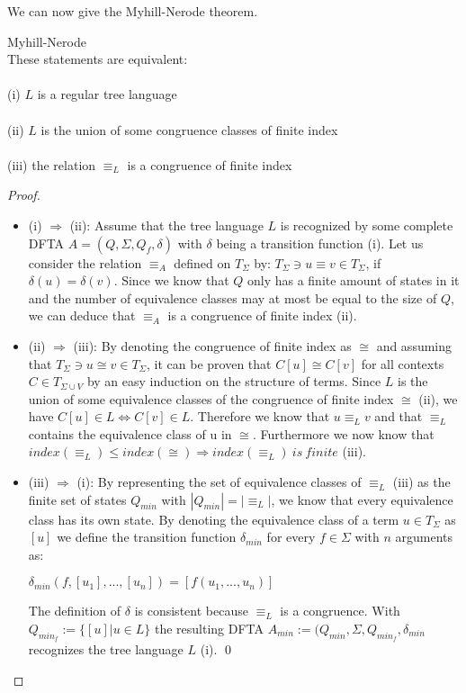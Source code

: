 \documentclass{llncs}
\begin{document}
\pagebreak

We can now give the Myhill-Nerode theorem.

\begin{theorem}{Myhill-Nerode} \cite{tata-nfta}\\
	These statements are equivalent:\\\\
	(i) \(L\) is a regular tree language\\\\
	(ii) \(L\) is the union of some congruence classes of finite index\\\\
	(iii) the relation \(\equiv_L\) is a congruence of finite index
\end{theorem}
\begin{proof}{~}
	\begin{itemize}
		\item (i) \(\Rightarrow\) (ii): Assume that the tree language \(L\) is recognized by some complete DFTA \(A = (Q, \Sigma, Q_f, \delta)\) with \(\delta\) being a transition function (i).
		Let us consider the relation \(\equiv_A\) defined on \(T_\Sigma\) by: \(T_\Sigma \ni u \equiv v \in T_\Sigma\), if \(\delta(u) = \delta(v)\). Since we know that \(Q\) only has a finite amount of states in it and the number of equivalence classes may at most be equal to the size of \(Q\), we can deduce that \(\equiv_A\) is a congruence of finite index (ii).
		\\
		\item (ii) \(\Rightarrow\) (iii): By denoting the congruence of finite index as \(\cong\) and assuming that \(T_\Sigma \ni u \cong v \in T_\Sigma\), it can be proven that \(C[u] \cong C[v]\) for all contexts \(C \in T_{\Sigma \cup V} \) by an easy induction on the structure of terms. Since \(L\) is the union of some equivalence classes of the congruence of finite index \(\cong\) (ii), we have \(C[u] \in L \iff C[v] \in L \). Therefore we know that  \( u \equiv_L v \) and that \( \equiv_L \) contains the equivalence class of u in \( \cong \). Furthermore we now know that \(index(\equiv_L) \leq index(\cong) \Rightarrow index(\equiv_L)~is~finite \) (iii).
		\\
		\item (iii) \(\Rightarrow\) (i):
		 By representing the set of equivalence classes of \( \equiv_L \) (iii) as the finite set of states \(Q_{min}\) with \(|Q_{min}| = |\equiv_L|\), we know that every equivalence class has its own state. By denoting the equivalence class of a term \(u \in T_\Sigma\) as \([u]\) we define the transition function \(\delta_{min}\) for every \( f \in \Sigma\) with \(n\) arguments as:
		 \begin{center}
			 \(\delta_{min}(f, [u_1], ..., [u_n]) = [f(u_1, ..., u_n)]\)
		 \end{center}
		 The definition of \(\delta\) is consistent because \(\equiv_L\) is a congruence. With \(Q_{min_f} := \{ [u] | u \in L \}\) the resulting DFTA \(A_{min} := (Q_{min}, \Sigma, Q_{min_f}, \delta_{min}\) recognizes the tree language \(L\) (i). 
		 \qed
	\end{itemize}
\end{proof}
\end{document}
